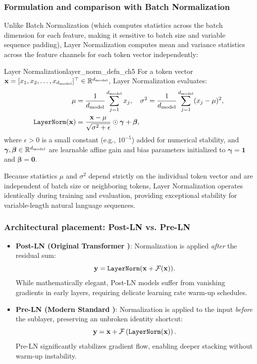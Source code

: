 \documentclass[../../main.tex]{subfiles}
\begin{document}
\subsubsection{Formulation and comparison with Batch Normalization}
Unlike Batch Normalization (which computes statistics across the batch dimension for each feature, making it sensitive to batch size and variable sequence padding), Layer Normalization computes mean and variance statistics across the feature channels for each token vector independently:
\begin{definition}{Layer Normalization}{layer_norm_defn_ch5}
For a token vector $\mathbf{x} = [x_1, x_2, \dots, x_{d_{\text{model}}}]^\top \in \mathbb{R}^{d_{\text{model}}}$, Layer Normalization evaluates:
\begin{align}
\mu &= \frac{1}{d_{\text{model}}} \sum_{j=1}^{d_{\text{model}}} x_j, \quad \sigma^2 = \frac{1}{d_{\text{model}}} \sum_{j=1}^{d_{\text{model}}} (x_j - \mu)^2, \\
\label{eq:layer_norm_formula_ch5}
\text{\texttt{LayerNorm}}(\mathbf{x}) &= \frac{\mathbf{x} - \mu}{\sqrt{\sigma^2 + \epsilon}} \odot \boldsymbol{\gamma} + \boldsymbol{\beta},
\end{align}
where $\epsilon > 0$ is a small constant (e.g., $10^{-5}$) added for numerical stability, and $\boldsymbol{\gamma}, \boldsymbol{\beta} \in \mathbb{R}^{d_{\text{model}}}$ are learnable affine gain and bias parameters initialized to $\boldsymbol{\gamma} = \mathbf{1}$ and $\boldsymbol{\beta} = \mathbf{0}$.
\end{definition}

Because statistics $\mu$ and $\sigma^2$ depend strictly on the individual token vector and are independent of batch size or neighboring tokens, Layer Normalization operates identically during training and evaluation, providing exceptional stability for variable-length natural language sequences.

\subsubsection{Architectural placement: Post-LN vs. Pre-LN}
\begin{itemize}
    \item \textbf{Post-LN (Original Transformer \cite{vaswani2017})}: Normalization is applied \emph{after} the residual sum:
    \begin{equation}
    \mathbf{y} = \text{\texttt{LayerNorm}}(\mathbf{x} + \mathcal{F}(\mathbf{x})).
    \end{equation}
    While mathematically elegant, Post-LN models suffer from vanishing gradients in early layers, requiring delicate learning rate warm-up schedules.
    \item \textbf{Pre-LN (Modern Standard \cite{radford2019, touvron2023llama})}: Normalization is applied to the input \emph{before} the sublayer, preserving an unbroken identity shortcut:
    \begin{equation}
    \mathbf{y} = \mathbf{x} + \mathcal{F}\left( \text{\texttt{LayerNorm}}(\mathbf{x}) \right).
    \end{equation}
    Pre-LN significantly stabilizes gradient flow, enabling deeper stacking without warm-up instability.
\end{itemize}
\end{document}
